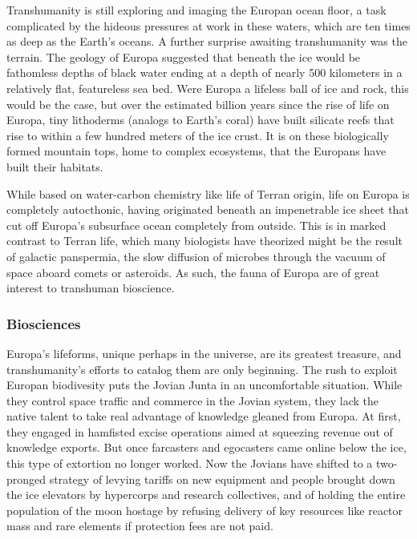 Transhumanity is still exploring and imaging the Europan ocean floor, a task complicated by the hideous pressures at work in these waters, which are ten times as deep as the Earth's oceans. A further surprise awaiting transhumanity was the terrain. The geology of Europa suggested that beneath the ice would be fathomless depths of black water ending at a depth of nearly 500 kilometers in a relatively flat, featureless sea bed. Were Europa a lifeless ball of ice and rock, this would be the case, but over the estimated billion years since the rise of life on Europa, tiny lithoderms (analogs to Earth's coral) have built silicate reefs that rise to within a few hundred meters of the ice crust. It is on these biologically formed mountain tops, home to complex ecosystems, that the Europans have built their habitats. 

While based on water-carbon chemistry like life of Terran origin, life on Europa is completely autocthonic, having originated beneath an impenetrable ice sheet that cut off Europa's subsurface ocean completely from outside. This is in marked contrast to Terran life, which many biologists have theorized might be the result of galactic panspermia, the slow diffusion of microbes through the vacuum of space aboard comets or asteroids. As such, the fauna of Europa are of great interest to transhuman bioscience. 

\subsubsection{Biosciences} \label{sec:biosciences} 

Europa's lifeforms, unique perhaps in the universe, are its greatest treasure, and transhumanity's efforts to catalog them are only beginning. The rush to exploit Europan biodivesity puts the Jovian Junta in an uncomfortable situation. While they control space traffic and commerce in the Jovian system, they lack the native talent to take real advantage of knowledge gleaned from Europa. At first, they engaged in hamfisted excise operations aimed at squeezing revenue out of knowledge exports. But once farcasters and egocasters came online below the ice, this type of extortion no longer worked. Now the Jovians have shifted to a two-pronged strategy of levying tariffs on new equipment and people brought down the ice elevators by hypercorps and research collectives, and of holding the entire population of the moon hostage by refusing delivery of key resources like reactor mass and rare elements if protection fees are not paid. 

